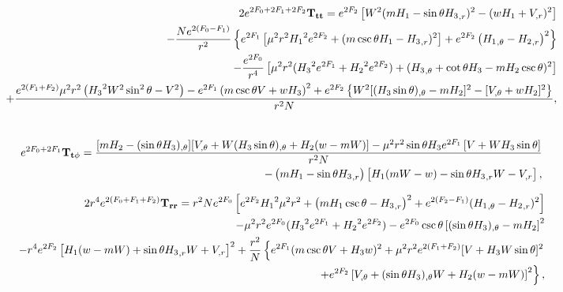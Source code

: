\begin{eqnarray}
&& 2e^{2F_0+2F_1+2F_2}{\bf T_{tt}}=e^{2F_2}\left[ W^2(m{H_1}  
- \sin\theta  
{H_3}_{,r} )^2
-(wH_1+V_{,r})^2\right] \nonumber \\
% 
&&
-\frac{N e^{2 ({F_0}-F_1)}}{r^2} \left\{e^{2 {F_1}}\left[ {\mu^2} r^2 {H_1}^2 e^{2 {F_2}}
+({m} \csc \theta  {H_1}
-{H_3}_{,r})^2\right] +e^{2
{F_2}}\left( {H_1}_{,\theta}- 
{H_2}_{,r}\right)^2\right\}
\nonumber \\
%
&&
- \frac{e^{2 F_0}}{r^4} \left[{\mu^2} 
r^2( {H_3}^2 e^{2 {F_1}}+ {H_2}^2 e^{2
{F_2}}) + ({H_3}_{,\theta}+ \cot
\theta  {H_3}-mH_2\csc\theta)^2\right]  \nonumber \\
%
%
&&
+\frac{ e^{2 (F_1+{F_2})} {\mu^2} r^2\left({H_3}^2  W^2 \sin ^2\theta  - V^2\right) -e^{2 {F_1}}\left(
{m} \csc\theta 
 V +w{H_3}  \right)^2  +e^{2 {F_2}}\left\{W^2[(H_3\sin\theta)_{,\theta}-mH_2]^2-[V_{,\theta}+wH_2]^2\right\}}{r^2N}, \nonumber \\
 && 
%
\end{eqnarray}


\begin{eqnarray}
&&  e^{2F_0+2F_1}{\bf T_{t\phi}}=\frac{[mH_2-(\sin\theta H_3)_{,\theta}][V_{,\theta}+W(H_3\sin\theta)_{,\theta}+H_2(w-mW)]-{\mu^2}r^2 \sin\theta {H_3} e^{2 {F_1}} \left[ 
V+WH_3 \sin\theta\right]}{r^2N}\nonumber \\ 
%
&&
- \left({m} {H_1}-\sin\theta 
{H_3}_{,r}\right) \left[{H_1} ({m} W-w)-\sin \theta {H_3}_{,r} W-V_{,r}\right],
\end{eqnarray}






\begin{eqnarray}
&& 2r^4e^{2(F_0+F_1+F_2)}{\bf T_{rr}}=
r^2 N e^{2 {F_0}} \left[
e^{2 F_2} {H_1}^2 {\mu^2} r^2
+\left( {m H_1} \csc\theta- {H_3}_{,r}\right)^2+e^{2 ({F_2}-F_1)}( {H_1}_{,\theta}-
{H_2}_{,r})^2\right] \nonumber \\ 
%
&&
-{\mu^2} r^2e^{2 {F_0}}( {H_3}^2 e^{2 {F_1}}+{H_2}^2e^{2F_2})-e^{2 {F_0}}\csc\theta\left[(\sin\theta{H_3})_{,\theta}-mH_2\right]^2  \nonumber \\
%
&&
-r^4 e^{2 {F_2}} \left[ {H_1} (w-{m} W) + \sin\theta  {H_3}_{,r} W+  
V_{,r}\right]^2
%
%
+\frac{r^2}{N} \left\{e^{2 {F_1}}({m} \csc\theta 
 V+{H_3}w)^2 +{\mu^2} r^2e^{2 ({F_1}+F_2)}[V+ {H_3} W \sin\theta]^2 
 \right. \nonumber \\
%
&&
\left.
+e^{2 {F_2}}\left[
V_{,\theta}+ (\sin\theta  
{H_3})_{,\theta} W+ 
{H_2} (w-{m} W)\right]^2\right\},
%
\end{eqnarray}
  
